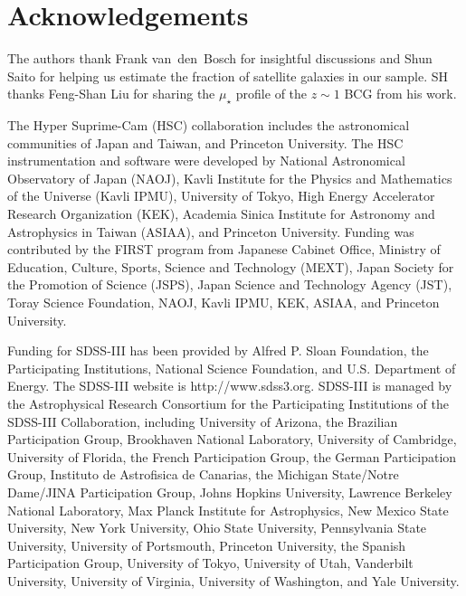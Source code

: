 \documentclass[a4paper,fleqn,usenatbib]{mnras}
\def\mden{{$\mu_{\star}$}}
\begin{document}

\section*{Acknowledgements}

  The authors thank Frank van~den~Bosch for insightful discussions and 
  Shun Saito for helping us estimate the fraction of satellite galaxies in our sample.
  SH thanks Feng-Shan Liu for sharing the \mden{} profile of the $z\sim1$ BCG from 
  his work.

  The Hyper Suprime-Cam (HSC) collaboration includes the astronomical communities of 
  Japan and Taiwan, and Princeton University.  The HSC instrumentation and software were
  developed by National Astronomical Observatory of Japan (NAOJ), Kavli Institute
  for the Physics and Mathematics of the Universe (Kavli IPMU), University of Tokyo,
  High Energy Accelerator Research Organization (KEK), Academia Sinica Institute
  for Astronomy and Astrophysics in Taiwan (ASIAA), and Princeton University.  
  Funding was contributed by the FIRST program from Japanese Cabinet Office,  Ministry 
  of Education, Culture, Sports, Science and Technology (MEXT), Japan Society for 
  the Promotion of Science (JSPS), Japan Science and Technology Agency (JST), Toray 
  Science Foundation, NAOJ, Kavli IPMU, KEK, ASIAA, and Princeton University.
   
  Funding for SDSS-III has been provided by Alfred P. Sloan Foundation, the 
  Participating Institutions, National Science Foundation, and U.S. Department of
  Energy. The SDSS-III website is http://www.sdss3.org.  SDSS-III is managed by the
  Astrophysical Research Consortium for the Participating Institutions of the SDSS-III
  Collaboration, including University of Arizona, the Brazilian Participation Group,
  Brookhaven National Laboratory, University of Cambridge, University of Florida, the
  French Participation Group, the German Participation Group, Instituto de Astrofisica
  de Canarias, the Michigan State/Notre Dame/JINA Participation Group, Johns Hopkins
  University, Lawrence Berkeley National Laboratory, Max Planck Institute for
  Astrophysics, New Mexico State University, New York University, Ohio State University,
  Pennsylvania State University, University of Portsmouth, Princeton University, the
  Spanish Participation Group, University of Tokyo, University of Utah, Vanderbilt
  University, University of Virginia, University of Washington, and Yale University.
  
\end{document}
